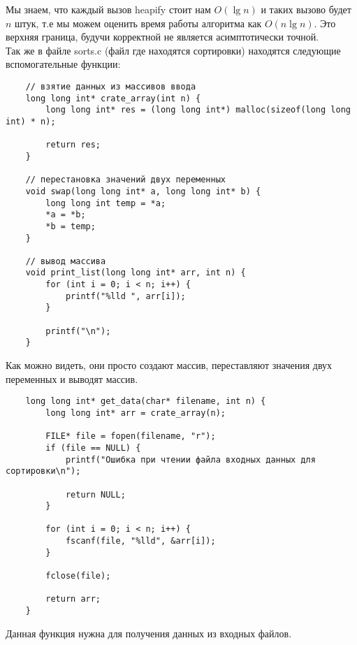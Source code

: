 \documentclass[a4paper,12pt,titlepage,finall]{article}
\begin{document}
Мы знаем, что каждый вызов heapify стоит нам $O(\lg n)$ и таких вызово будет
$n$ штук, т.е мы можем оценить время работы алгоритма как $O(n\lg n)$. Это верхняя граница, будучи корректной
не является асимптотически точной.
\\

Так же в файле sorts.c (файл где находятся сортировки) находятся следующие вспомогательные функции:

\begin{verbatim}
    // взятие данных из массивов ввода
    long long int* crate_array(int n) {
        long long int* res = (long long int*) malloc(sizeof(long long int) * n);

        return res;
    }

    // перестановка значений двух переменных
    void swap(long long int* a, long long int* b) {
        long long int temp = *a;
        *a = *b;
        *b = temp;
    }

    // вывод массива
    void print_list(long long int* arr, int n) {
        for (int i = 0; i < n; i++) {
            printf("%lld ", arr[i]);
        }

        printf("\n");
    }
\end{verbatim}

Как можно видеть, они просто создают массив, переставляют значения двух переменных и выводят массив. \\

\begin{verbatim}
    long long int* get_data(char* filename, int n) {
        long long int* arr = crate_array(n);
    
        FILE* file = fopen(filename, "r");
        if (file == NULL) {
            printf("Ошибка при чтении файла входных данных для сортировки\n");
    
            return NULL;
        }
    
        for (int i = 0; i < n; i++) {
            fscanf(file, "%lld", &arr[i]);
        }
    
        fclose(file);
    
        return arr;
    }
\end{verbatim}

Данная функция нужна для получения данных из входных файлов.
\end{document}
